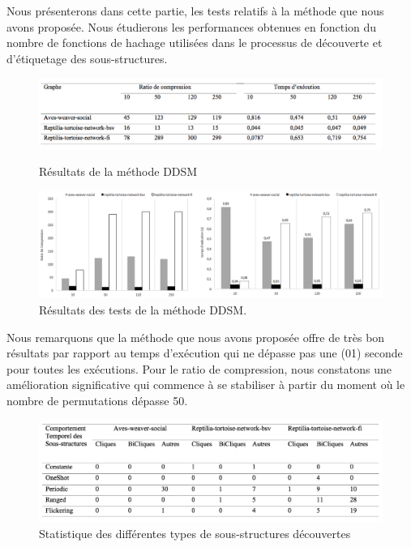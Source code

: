 	Nous présenterons dans cette partie, les tests relatifs à la méthode que nous avons proposée. Nous étudierons les performances obtenues en fonction du nombre de fonctions de hachage utilisées dans le processus de découverte et d'étiquetage des sous-structures. 
\begin{figure}[H]
	
	\includegraphics[scale=0.4]{ressources/image/grDDSM.png}
	\label{fig:perte }
	\caption{Résultats de la méthode DDSM}
\end{figure}
		\begin{figure}[H]
		\begin{center}
		 \includegraphics[scale=0.45]{ressources/image/DDSM.png}
			
			
			\caption{Résultats des tests de la méthode DDSM.}
			\label{fig:test-ddsm}
		\end{center}
	\end{figure}
	
	Nous remarquons que la méthode que nous avons proposée offre de très bon résultats par rapport au temps d'exécution qui ne dépasse pas une (01) seconde pour toutes les exécutions. Pour le ratio de compression, nous constatons une amélioration significative qui commence à se stabiliser à partir du moment où le nombre de permutations dépasse 50. 
	
	\begin{figure}[H]
		
		 \includegraphics[scale=0.38]{ressources/image/statDDSM.png}
			
			
			\caption{Statistique des différentes types de sous-structures découvertes}
			\label{fig:stat-DDSM}
		
	\end{figure}	
	
